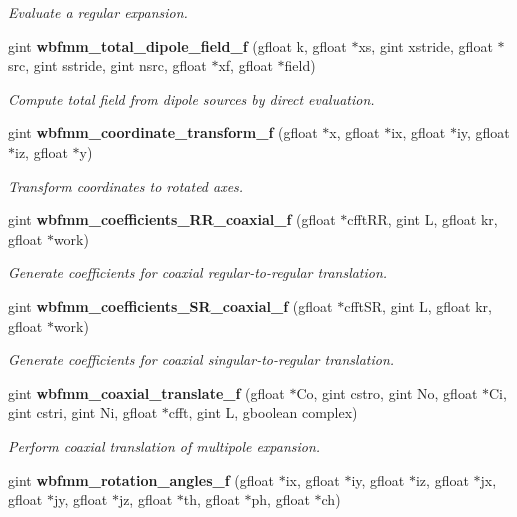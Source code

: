 \begin{DoxyCompactItemize}
\begin{DoxyCompactList}\small\item\em Evaluate a regular expansion. \end{DoxyCompactList}\item 
gint \textbf{ wbfmm\+\_\+total\+\_\+dipole\+\_\+field\+\_\+f} (gfloat k, gfloat $\ast$xs, gint xstride, gfloat $\ast$src, gint sstride, gint nsrc, gfloat $\ast$xf, gfloat $\ast$field)
\begin{DoxyCompactList}\small\item\em Compute total field from dipole sources by direct evaluation. \end{DoxyCompactList}\item 
gint \textbf{ wbfmm\+\_\+coordinate\+\_\+transform\+\_\+f} (gfloat $\ast$x, gfloat $\ast$ix, gfloat $\ast$iy, gfloat $\ast$iz, gfloat $\ast$y)
\begin{DoxyCompactList}\small\item\em Transform coordinates to rotated axes. \end{DoxyCompactList}\item 
gint \textbf{ wbfmm\+\_\+coefficients\+\_\+\+R\+R\+\_\+coaxial\+\_\+f} (gfloat $\ast$cfft\+RR, gint L, gfloat kr, gfloat $\ast$work)
\begin{DoxyCompactList}\small\item\em Generate coefficients for coaxial regular-\/to-\/regular translation. \end{DoxyCompactList}\item 
gint \textbf{ wbfmm\+\_\+coefficients\+\_\+\+S\+R\+\_\+coaxial\+\_\+f} (gfloat $\ast$cfft\+SR, gint L, gfloat kr, gfloat $\ast$work)
\begin{DoxyCompactList}\small\item\em Generate coefficients for coaxial singular-\/to-\/regular translation. \end{DoxyCompactList}\item 
gint \textbf{ wbfmm\+\_\+coaxial\+\_\+translate\+\_\+f} (gfloat $\ast$Co, gint cstro, gint No, gfloat $\ast$Ci, gint cstri, gint Ni, gfloat $\ast$cfft, gint L, gboolean complex)
\begin{DoxyCompactList}\small\item\em Perform coaxial translation of multipole expansion. \end{DoxyCompactList}\item 
gint \textbf{ wbfmm\+\_\+rotation\+\_\+angles\+\_\+f} (gfloat $\ast$ix, gfloat $\ast$iy, gfloat $\ast$iz, gfloat $\ast$jx, gfloat $\ast$jy, gfloat $\ast$jz, gfloat $\ast$th, gfloat $\ast$ph, gfloat $\ast$ch)

\end{DoxyCompactItemize}

